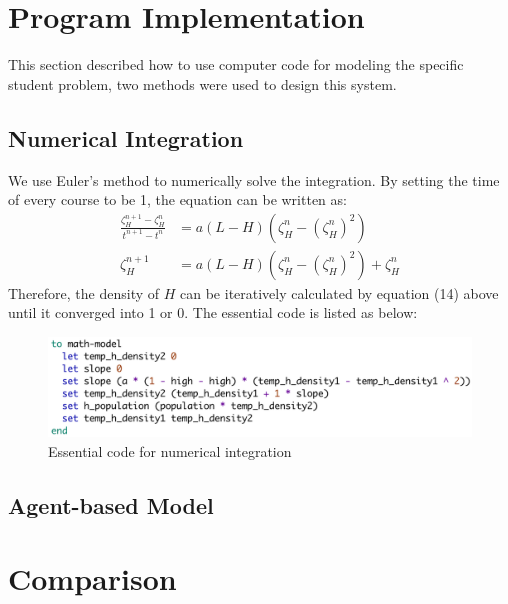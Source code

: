 \documentclass[a4paper, 12pt]{article}
\begin{document}
\section{Program Implementation}
This section described how to use computer code for modeling the specific student problem, two methods were used to design this system. 
\subsection{Numerical Integration}
We use Euler's method to numerically solve the integration. By setting the time of every course to be 1, the equation can be written as:
\vspace{-3mm}
\begin{equation}
\begin{split}
	\frac{\zeta_{H}^{n+1}-\zeta_{H}^{n}}{t^{n+1}-t^{n}} & = a(L-H)( \zeta_{H}^{n} - (\zeta_{H}^{n})^{2}) \\
	\zeta_{H}^{n+1} &=  a(L-H)( \zeta_{H}^{n} - (\zeta_{H}^{n})^{2}) + \zeta_{H}^{n}
\end{split}
\end{equation}
Therefore, the density of $H$ can be iteratively calculated by equation (14) above until it converged into 1 or 0. The essential code is listed as below:
\begin{figure}[!h]
  \centering
  \includegraphics[width=6in]{./figures/code1}
  \caption{Essential code for numerical integration}
  \label{integrate}
\end{figure}

\subsection{Agent-based Model}
\section{Comparison}
\end{document}
